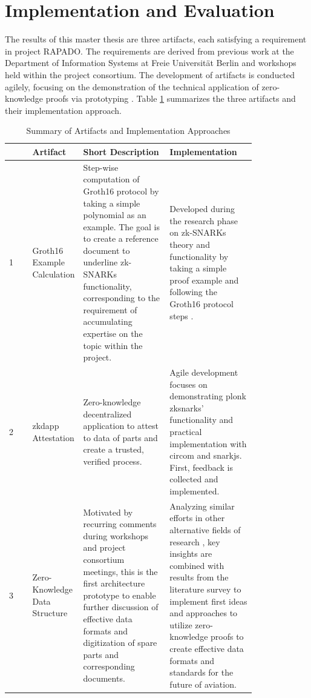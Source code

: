\section{Implementation and Evaluation}
The results of this master thesis are three artifacts, each satisfying a requirement in project RAPADO. The requirements are derived from previous work at the Department of Information Systems at Freie Universit{\"a}t Berlin and workshops held within the project consortium. The development of artifacts is conducted agilely, focusing on the demonstration of the technical application of zero-knowledge proofs via prototyping \citep{mci/Wilde2007}. Table \ref{tab:summary_artifacts} summarizes the three artifacts and their implementation approach.
\setlength{\tabcolsep}{2ex}
\renewcommand{\arraystretch}{1.5}%
\begin{table}[htb]
	\centering
	    \caption{Summary of Artifacts and Implementation Approaches}
		\begin{tabular}{|m{0.001\linewidth} | m{0.11\linewidth} | m{0.35\linewidth} | m{0.35\linewidth} |}
		\hline
		\textbf{}& \textbf{Artifact} & \textbf{Short Description} & \textbf{Implementation} \\ \hline
            1&Groth16 Example \newline Calculation & Step-wise computation of Groth16 protocol by taking a simple polynomial as an example. The goal is to create a reference document to underline zk-SNARKs functionality, corresponding to the requirement of accumulating expertise on the topic within the project. & Developed during the research phase on zk-SNARKs theory and functionality by taking a simple proof example and following the Groth16 protocol steps \citep{Groth2016OnTS}. \\  \hline
            2&\acrshort{zkdapp}  \newline Attestation & Zero-knowledge decentralized application to attest to  data of parts and create a trusted, verified process. & Agile development focuses on demonstrating \acrshort{plonk} \acrshort{zksnark}s' functionality and practical implementation with circom and snarkjs. First, feedback is collected and implemented. \\ \hline 
            3&Zero-Knowledge Data \newline Structure & Motivated by recurring comments during workshops and project consortium meetings, this is the first architecture prototype to enable further discussion of effective data formats and digitization of spare parts and corresponding documents. & Analyzing similar efforts in other alternative fields of research \citep{sedlemeirgrenenergy}, key insights are combined with results from the literature survey to implement first ideas and approaches to utilize zero-knowledge proofs to create effective data formats and standards for the future of aviation. \\ \hline 
	\end{tabular}
\label{tab:summary_artifacts}
\end{table}

